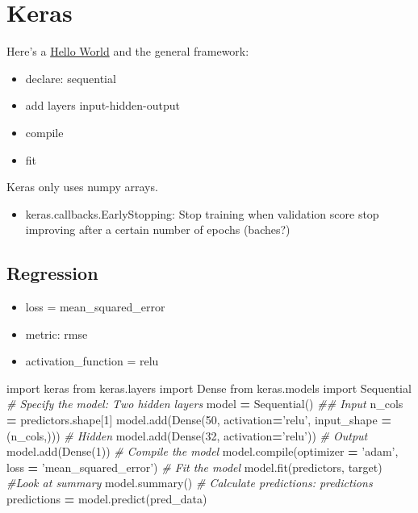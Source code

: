 \documentclass[]{book}
\newenvironment{Shaded}{\begin{snugshade}}{\end{snugshade}}
\newcommand{\DecValTok}[1]{\textcolor[rgb]{0.00,0.00,0.81}{#1}}
\newcommand{\StringTok}[1]{\textcolor[rgb]{0.31,0.60,0.02}{#1}}
\newcommand{\ImportTok}[1]{#1}
\newcommand{\CommentTok}[1]{\textcolor[rgb]{0.56,0.35,0.01}{\textit{#1}}}
\newcommand{\OperatorTok}[1]{\textcolor[rgb]{0.81,0.36,0.00}{\textbf{#1}}}
\newcommand{\BuiltInTok}[1]{#1}
\newcommand{\NormalTok}[1]{#1}
\providecommand{\tightlist}{%
  \setlength{\itemsep}{0pt}\setlength{\parskip}{0pt}}
\theoremstyle{definition}
\theoremstyle{definition}
\theoremstyle{definition}
\theoremstyle{remark}
\begin{document}
\section{Keras}\label{keras}

Here's a
\href{https://github.com/fastforwardlabs/keras-hello-world/blob/master/kerashelloworld.ipynb}{Hello
World} and the general framework:

\begin{itemize}
\item
  declare: sequential
\item
  add layers input-hidden-output
\item
  compile
\item
  fit
\end{itemize}

Keras only uses numpy arrays.

\begin{itemize}
\tightlist
\item
  keras.callbacks.EarlyStopping: Stop training when validation score
  stop improving after a certain number of epochs (baches?)
\end{itemize}

\subsection{Regression}\label{regression}

\begin{itemize}
\item
  loss = mean\_squared\_error
\item
  metric: rmse
\item
  activation\_function = relu
\end{itemize}

\begin{Shaded}
\begin{Highlighting}[]
\ImportTok{import}\NormalTok{ keras}
\ImportTok{from}\NormalTok{ keras.layers }\ImportTok{import}\NormalTok{ Dense}
\ImportTok{from}\NormalTok{ keras.models }\ImportTok{import}\NormalTok{ Sequential}
\CommentTok{# Specify the model: Two hidden layers}
\NormalTok{model }\OperatorTok{=}\NormalTok{ Sequential()}
\CommentTok{## Input}
\NormalTok{n_cols }\OperatorTok{=}\NormalTok{ predictors.shape[}\DecValTok{1}\NormalTok{]}
\NormalTok{model.add(Dense(}\DecValTok{50}\NormalTok{, activation}\OperatorTok{=}\StringTok{'relu'}\NormalTok{, input_shape }\OperatorTok{=}\NormalTok{ (n_cols,)))}
\CommentTok{# Hidden}
\NormalTok{model.add(Dense(}\DecValTok{32}\NormalTok{, activation}\OperatorTok{=}\StringTok{'relu'}\NormalTok{))}
\CommentTok{# Output}
\NormalTok{model.add(Dense(}\DecValTok{1}\NormalTok{))}
\CommentTok{# Compile the model}
\NormalTok{model.}\BuiltInTok{compile}\NormalTok{(optimizer }\OperatorTok{=} \StringTok{'adam'}\NormalTok{, loss }\OperatorTok{=} \StringTok{'mean_squared_error'}\NormalTok{) }
\CommentTok{# Fit the model}
\NormalTok{model.fit(predictors, target)}
\CommentTok{#Look at summary}
\NormalTok{model.summary()}
\CommentTok{# Calculate predictions: predictions}
\NormalTok{predictions }\OperatorTok{=}\NormalTok{ model.predict(pred_data)}
\end{Highlighting}
\end{Shaded}
\end{document}
